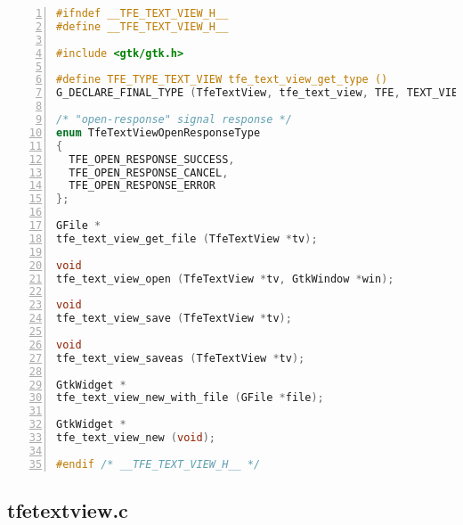 \begin{lstlisting}[language=C, numbers=left]
#ifndef __TFE_TEXT_VIEW_H__
#define __TFE_TEXT_VIEW_H__

#include <gtk/gtk.h>

#define TFE_TYPE_TEXT_VIEW tfe_text_view_get_type ()
G_DECLARE_FINAL_TYPE (TfeTextView, tfe_text_view, TFE, TEXT_VIEW, GtkTextView)

/* "open-response" signal response */
enum TfeTextViewOpenResponseType
{
  TFE_OPEN_RESPONSE_SUCCESS,
  TFE_OPEN_RESPONSE_CANCEL,
  TFE_OPEN_RESPONSE_ERROR
};

GFile *
tfe_text_view_get_file (TfeTextView *tv);

void
tfe_text_view_open (TfeTextView *tv, GtkWindow *win);

void
tfe_text_view_save (TfeTextView *tv);

void
tfe_text_view_saveas (TfeTextView *tv);

GtkWidget *
tfe_text_view_new_with_file (GFile *file);

GtkWidget *
tfe_text_view_new (void);

#endif /* __TFE_TEXT_VIEW_H__ */
\end{lstlisting}

\hypertarget{tfetextview.c}{%
\subsection{tfetextview.c}\label{tfetextview.c}}

